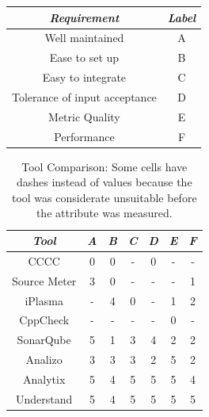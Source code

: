 \begin{table}[ht]
	\centering
	\begin{tabular}{c|c}
		\hline
		\textit{Requirement}          & \textit{Label} \\
		\hline
		\hline
		Well maintained               & A              \\
		Ease to set up                & B              \\
		Easy to integrate             & C              \\
		Tolerance of input acceptance & D              \\
		Metric Quality                & E              \\
		Performance                   & F              \\
		\hline
	\end{tabular}
	\label{tbl:ex1}
\end{table}

\begin{table}[H]
	\centering
	\caption{Tool Comparison: Some cells have dashes instead of values because the tool was considerate unsuitable before the attribute was measured.}
	\label{tab:comp}
	\begin{tabular}{c|c|c|c|c|c|c}
		\hline
		\textit{Tool} & \textit{A} & \textit{B} & \textit{C} & \textit{D} & \textit{E} & \textit{F} \\
		\hline
    \hline
		CCCC          & 0          & 0          & -          & 0          & -          & -          \\
		Source Meter  & 3          & 0          & -          & -          & -          & 1          \\
		iPlasma       & -          & 4          & 0          & -          & 1          & 2          \\
		CppCheck      & -          & -          & -          & -          & 0          & -          \\
		SonarQube     & 5          & 1          & 3          & 4          & 2          & 2          \\
		Analizo       & 3          & 3          & 3          & 2          & 5          & 2          \\
		Analytix      & 5          & 4          & 5          & 5          & 5          & 4          \\
		Understand    & 5          & 4          & 5          & 5          & 5          & 5          \\
    \hline
  \end{tabular}
\end{table}

